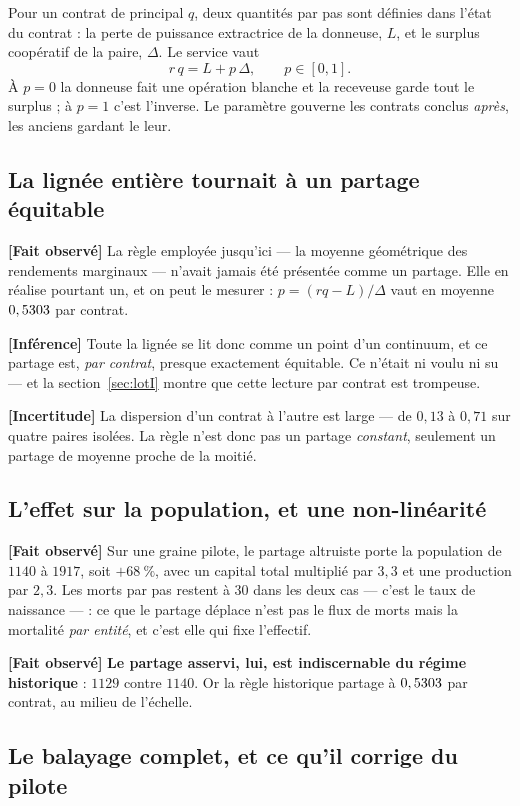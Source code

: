 \documentclass[11pt,a4paper]{article}
\newcommand{\fait}{\textbf{[Fait observé]}}
\newcommand{\inference}{\textbf{[Inférence]}}
\newcommand{\incertitude}{\textbf{[Incertitude]}}
\begin{document}
Pour un contrat de principal $q$, deux quantités par pas sont définies dans
l'état du contrat : la perte de puissance extractrice de la donneuse, $L$, et
le surplus coopératif de la paire, $\Delta$. Le service vaut
\[
r\,q = L + p\,\Delta, \qquad p \in [0,1].
\]
À $p = 0$ la donneuse fait une opération blanche et la receveuse garde tout
le surplus ; à $p = 1$ c'est l'inverse. Le paramètre gouverne les contrats
conclus \emph{après}, les anciens gardant le leur.

\subsection{La lignée entière tournait à un partage équitable}

\fait{} La règle employée jusqu'ici --- la moyenne géométrique des rendements
marginaux --- n'avait jamais été présentée comme un partage. Elle en réalise
pourtant un, et on peut le mesurer : $p = (r q - L)/\Delta$ vaut en moyenne
$0,5303$ par contrat.

\inference{} Toute la lignée se lit donc comme un point d'un continuum, et
ce partage est, \emph{par contrat}, presque exactement équitable. Ce n'était
ni voulu ni su --- et la section~\ref{sec:lotI} montre que cette lecture par
contrat est trompeuse.

\incertitude{} La dispersion d'un contrat à l'autre est large --- de $0{,}13$
à $0{,}71$ sur quatre paires isolées. La règle n'est donc pas un partage
\emph{constant}, seulement un partage de moyenne proche de la moitié.

\subsection{L'effet sur la population, et une non-linéarité}

\fait{} Sur une graine pilote, le partage altruiste porte la population de
$1140$ à $1917$, soit \textbf{$+68~\%$}, avec un capital total multiplié par
$3{,}3$ et une production par $2{,}3$. Les morts par pas restent à $30$ dans
les deux cas --- c'est le taux de naissance --- : ce que le partage déplace
n'est pas le flux de morts mais la mortalité \emph{par entité}, et c'est elle
qui fixe l'effectif.

\fait{} \textbf{Le partage asservi, lui, est indiscernable du régime
historique} : $1129$ contre $1140$. Or la règle historique partage à
$0,5303$ par contrat, au milieu de l'échelle.

\subsection{Le balayage complet, et ce qu'il corrige du pilote}
\end{document}
